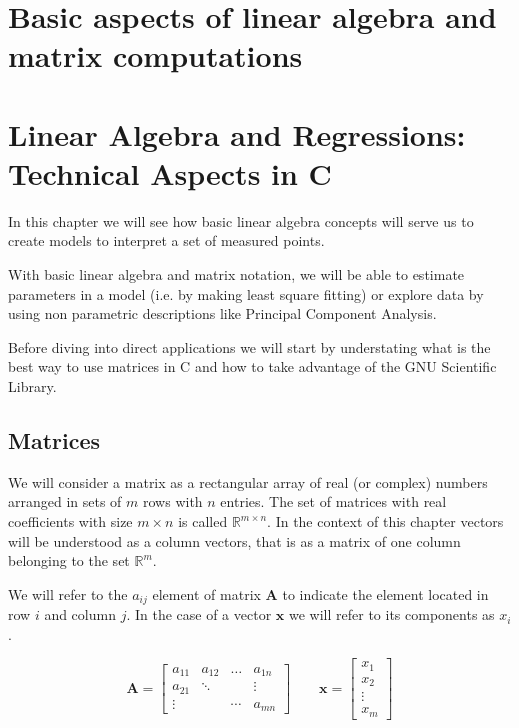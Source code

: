 \documentclass{article}
\newcommand{\real}{\mathbb{R}}
\begin{document}
\setcounter{section}{4}
\section{Basic aspects of linear algebra and matrix computations}


\section{Linear Algebra and Regressions: Technical Aspects in C}
In this chapter we will see how basic linear algebra concepts will serve us to create models to interpret a set of measured points.

With basic linear algebra and matrix notation, we will be able to estimate parameters in a model (i.e. by making least square fitting) or explore data by using non parametric descriptions like Principal Component Analysis.

Before diving into direct applications we will start by 
understating what is the best way to use matrices in C and how to take advantage of the GNU Scientific Library.


\subsection{Matrices}
We will consider a matrix as a rectangular array of real (or complex) numbers arranged in sets of $m$ rows with $n$ entries. The set of matrices with real coefficients with size $m\times n$ is called $\real^{m\times n}$. In the context of this chapter vectors will be understood as a column vectors, that is as a matrix of one column belonging to the set $\real^{m}$. 

We will refer to the $a_{ij}$ element of matrix ${\mathbf A}$ to indicate the element located in row $i$ and column $j$. In the case of a vector ${\mathbf x}$ we will refer to its components as $x_{i}$.


\begin{displaymath}
\mathbf{A} = 
\left[
\begin{array}{cccc}
a_{11}  & a_{12}  & \dots & a_{1n}   \\
a_{21}  &  \ddots &  & \vdots  \\
\vdots  &  & \cdots & a_{mn}   
\end{array}
\right]
\qquad
\mathbf{x} = 
\left[
\begin{array}{c}
x_{1}     \\
x_2          \\
\vdots     \\
x_{m}   
\end{array}
\right]
\end{displaymath}
\end{document}
